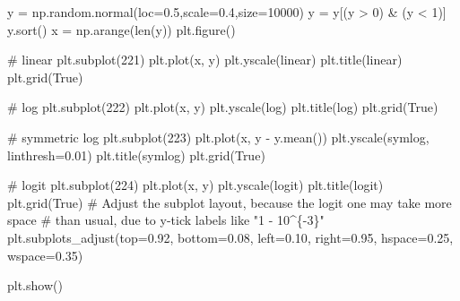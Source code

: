 \documentclass[
  letterpaper,
]{article}
\newenvironment{Shaded}{\begin{snugshade}}{\end{snugshade}}
\newcommand{\BuiltInTok}[1]{\textcolor[rgb]{0.00,0.23,0.31}{#1}}
\newcommand{\CommentTok}[1]{\textcolor[rgb]{0.37,0.37,0.37}{#1}}
\newcommand{\DecValTok}[1]{\textcolor[rgb]{0.68,0.00,0.00}{#1}}
\newcommand{\FloatTok}[1]{\textcolor[rgb]{0.68,0.00,0.00}{#1}}
\newcommand{\NormalTok}[1]{\textcolor[rgb]{0.00,0.23,0.31}{#1}}
\newcommand{\OperatorTok}[1]{\textcolor[rgb]{0.37,0.37,0.37}{#1}}
\newcommand{\StringTok}[1]{\textcolor[rgb]{0.13,0.47,0.30}{#1}}
\newcommand{\VariableTok}[1]{\textcolor[rgb]{0.07,0.07,0.07}{#1}}
\begin{document}
\begin{Shaded}
\begin{Highlighting}[]
\NormalTok{y }\OperatorTok{=}\NormalTok{ np.random.normal(loc}\OperatorTok{=}\FloatTok{0.5}\NormalTok{,scale}\OperatorTok{=}\FloatTok{0.4}\NormalTok{,size}\OperatorTok{=}\DecValTok{10000}\NormalTok{)}
\NormalTok{y }\OperatorTok{=}\NormalTok{ y[(y }\OperatorTok{\textgreater{}} \DecValTok{0}\NormalTok{) }\OperatorTok{\&}\NormalTok{ (y }\OperatorTok{\textless{}} \DecValTok{1}\NormalTok{)]}
\NormalTok{y.sort()}
\NormalTok{x }\OperatorTok{=}\NormalTok{ np.arange(}\BuiltInTok{len}\NormalTok{(y))}
\NormalTok{plt.figure()}

\CommentTok{\# linear}
\NormalTok{plt.subplot(}\DecValTok{221}\NormalTok{)}
\NormalTok{plt.plot(x, y)}
\NormalTok{plt.yscale(}\StringTok{\textquotesingle{}linear\textquotesingle{}}\NormalTok{)}
\NormalTok{plt.title(}\StringTok{\textquotesingle{}linear\textquotesingle{}}\NormalTok{)}
\NormalTok{plt.grid(}\VariableTok{True}\NormalTok{)}

\CommentTok{\# log}
\NormalTok{plt.subplot(}\DecValTok{222}\NormalTok{)}
\NormalTok{plt.plot(x, y)}
\NormalTok{plt.yscale(}\StringTok{\textquotesingle{}log\textquotesingle{}}\NormalTok{)}
\NormalTok{plt.title(}\StringTok{\textquotesingle{}log\textquotesingle{}}\NormalTok{)}
\NormalTok{plt.grid(}\VariableTok{True}\NormalTok{)}

\CommentTok{\# symmetric log}
\NormalTok{plt.subplot(}\DecValTok{223}\NormalTok{)}
\NormalTok{plt.plot(x, y }\OperatorTok{{-}}\NormalTok{ y.mean())}
\NormalTok{plt.yscale(}\StringTok{\textquotesingle{}symlog\textquotesingle{}}\NormalTok{, linthresh}\OperatorTok{=}\FloatTok{0.01}\NormalTok{)}
\NormalTok{plt.title(}\StringTok{\textquotesingle{}symlog\textquotesingle{}}\NormalTok{)}
\NormalTok{plt.grid(}\VariableTok{True}\NormalTok{)}

\CommentTok{\# logit}
\NormalTok{plt.subplot(}\DecValTok{224}\NormalTok{)}
\NormalTok{plt.plot(x, y)}
\NormalTok{plt.yscale(}\StringTok{\textquotesingle{}logit\textquotesingle{}}\NormalTok{)}
\NormalTok{plt.title(}\StringTok{\textquotesingle{}logit\textquotesingle{}}\NormalTok{)}
\NormalTok{plt.grid(}\VariableTok{True}\NormalTok{)}
\CommentTok{\# Adjust the subplot layout, because the logit one may take more space}
\CommentTok{\# than usual, due to y{-}tick labels like "1 {-} 10\^{}\{{-}3\}"}
\NormalTok{plt.subplots\_adjust(top}\OperatorTok{=}\FloatTok{0.92}\NormalTok{, bottom}\OperatorTok{=}\FloatTok{0.08}\NormalTok{, left}\OperatorTok{=}\FloatTok{0.10}\NormalTok{, right}\OperatorTok{=}\FloatTok{0.95}\NormalTok{, hspace}\OperatorTok{=}\FloatTok{0.25}\NormalTok{,}
\NormalTok{                    wspace}\OperatorTok{=}\FloatTok{0.35}\NormalTok{)}

\NormalTok{plt.show()}
\end{Highlighting}
\end{Shaded}
\end{document}
